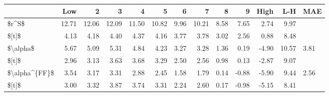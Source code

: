 \begin{tabular}{lrrrrrrrrrrrl}
\toprule
{} &    Low &      2 &      3 &      4 &      5 &     6 &      7 &     8 &     9 &  High &    L-H &   MAE \\
\midrule
\$r\textasciicircum S\$         &  12.71 &  12.06 &  12.09 &  11.50 &  10.82 &  9.96 &  10.21 &  8.58 &  7.65 &  2.74 &   9.97 &       \\
\$[t]\$         &   4.13 &   4.18 &   4.40 &   4.37 &   4.16 &  3.77 &   3.78 &  3.02 &  2.56 &  0.88 &   8.48 &       \\
\$\textbackslash alpha\$      &   5.67 &   5.09 &   5.31 &   4.84 &   4.23 &  3.27 &   3.28 &  1.36 &  0.19 & -4.90 &  10.57 &  3.81 \\
\$[t]\$         &   2.96 &   3.13 &   3.63 &   3.68 &   3.29 &  2.50 &   2.56 &  0.98 &  0.13 & -2.87 &   9.07 &       \\
\$\textbackslash alpha\textasciicircum \{FF\}\$ &   3.54 &   3.17 &   3.31 &   2.88 &   2.45 &  1.58 &   1.79 &  0.14 & -0.88 & -5.90 &   9.44 &  2.56 \\
\$[t]\$         &   3.00 &   3.32 &   3.87 &   3.74 &   3.31 &  2.24 &   2.60 &  0.17 & -0.98 & -5.15 &   8.41 &       \\
\bottomrule
\end{tabular}
